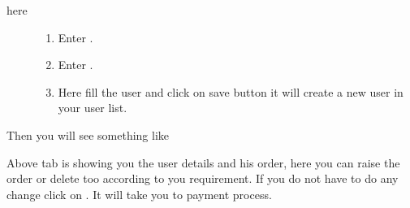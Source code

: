 \documentclass[a4paper,10pt,english]{report}
\begin{document}
\begin{figure}[htbp]
\centering

\noindent{}
\end{figure}
\begin{description}
\item[{here}] \leavevmode\begin{enumerate}
\def\theenumi{\arabic{enumi}}
\def\labelenumi{\theenumi .}
\makeatletter\def\p@enumii{\p@enumi \theenumi .}\makeatother
\item {} 
Enter  .

\item {} 
Enter  .

\item {} 
Here fill the user  and click on save button it will create a new user in your user list.

\end{enumerate}

\end{description}

Then you will see something like

\begin{figure}[htbp]
\centering

\noindent{}
\end{figure}

Above tab is showing you the user details and his order, here you can raise the order or delete too according to you requirement. If you do not have to do any change click on  . It will take you to payment process.

\begin{figure}[htbp]
\centering

\noindent{}
\end{figure}
\end{document}
